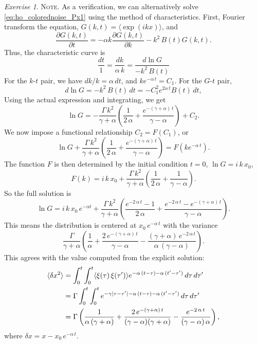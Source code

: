 \documentclass{book}
\numberwithin{equation}{section}
\theoremstyle{plain}
\theoremstyle{definition}
\theoremstyle{remark}
\theoremstyle{BoldStyle}
\newtheorem{exercise}{Exercise}
\numberwithin{exercise}{section}
\newcommand{\note}[1]{{\color{DarkGreen}\footnotesize \textsc{Note.} #1}}
\begin{document}
\begin{exercise}
  \note{
    As a verification,
    we can alternatively solve \eqref{eq:ho_colorednoise_Px1} using
    the method of characteristics.
    First, Fourier transform the equation,
    $G(k,t) = \langle \exp(ikx) \rangle$,
    and
    $$
    \frac{ \partial G(k, t) } { \partial t }
    =
    -\alpha k \frac{ \partial G(k, t) } { \partial k }
    - k^2 \, B(t) G(k, t).
    $$
    Thus, the characteristic curve is
    $$
    \frac{ dt } { 1 }
    =
    \frac{ dk } { \alpha \, k }
    =
    \frac{ d\ln G } { -k^2 \, B(t) }
    $$
    For the $k$-$t$ pair, we have $dk/k = \alpha \, dt$,
    and $k e^{-\alpha \, t} = C_1$.
    For the $G$-$t$ pair,
    $$
    d\ln G = -k^2 \, B(t) \, dt = -C_1^2 e^{2\alpha\, t} B(t) \, dt,
    $$
    Using the actual expression and integrating, we get
    $$
    \ln G = -\frac{\Gamma \, k^2 }{ \gamma + \alpha }
    \left( \frac{1}{2 \, \alpha} + \frac{e^{-(\gamma + \alpha) \,t }}{\gamma - \alpha} \right)
    + C_2.
    $$
    We now impose a functional relationship $C_2 = F(C_1)$, or
    $$
    \ln G + \frac{\Gamma \, k^2 }{ \gamma + \alpha }
    \left( \frac{1}{2 \, \alpha} + \frac{e^{-(\gamma + \alpha) \,t }}{\gamma - \alpha} \right)
    = F(ke^{-\alpha \, t}).
    $$
    The function $F$ is then determined by the initial condition $t = 0$,
    $\ln G = i \, k \, x_0$,
    $$
    F(k) = i \, k \, x_0 + \frac{\Gamma \, k^2 }{ \gamma + \alpha }
    \left( \frac{1}{2 \, \alpha} + \frac{1}{\gamma - \alpha} \right).
    $$
    So the full solution is
    $$
    \ln G = i \, k \, x_0 \, e^{-\alpha t} + \frac{\Gamma \, k^2 }{ \gamma + \alpha }
    \left( \frac{e^{-2 \, \alpha \, t} - 1}{2 \, \alpha}
    + \frac{e^{-2 \, \alpha \, t} - e^{-(\gamma + \alpha) \, t} }{\gamma - \alpha} \right).
    $$
    This means the distribution is centered at $x_0 \, e^{-\alpha \, t}$
    with the variance
    $$
    \frac{\Gamma }{ \gamma + \alpha }
    \left( \frac{1}{\alpha}
    + \frac{ 2 \, e^{-(\gamma + \alpha) \, t} }{\gamma - \alpha}
    - \frac{ (\gamma + \alpha) \, e^{-2\, \alpha \, t} }{\alpha \, (\gamma - \alpha)} \right).
    $$
    This agrees with the value computed from the explicit solution:
    \begin{align}
    \langle \delta x^2 \rangle
     &=
    \int_0^t\int_0^t \langle \xi(\tau) \, \xi(\tau') \rangle
    e^{-\alpha \, (t-\tau)- \alpha \, (t'-\tau')} \, d\tau \, d\tau'
    \notag \\
     &=
    \Gamma \int_0^t\int_0^t
    e^{-\gamma|\tau - \tau'|-\alpha \, (t-\tau) - \alpha \, (t'-\tau')} \, d\tau \, d\tau'
    \notag
    \\
     &=
    \Gamma
    \left(
      \frac{1}{\alpha \,(\gamma + \alpha) }
      +
      \frac{2 \, e^{-(\gamma + \alpha) \, t} }{(\gamma - \alpha) (\gamma + \alpha) }
      -
      \frac{e^{-2 \, \alpha \, t} }{(\gamma - \alpha) \, \alpha }
    \right),
    \label{eq:ho_colorednoise_var}
    \end{align}
    where
    $\delta x = x - x_0 \, e^{-\alpha \, t}$.
  }

\end{exercise}
\end{document}
